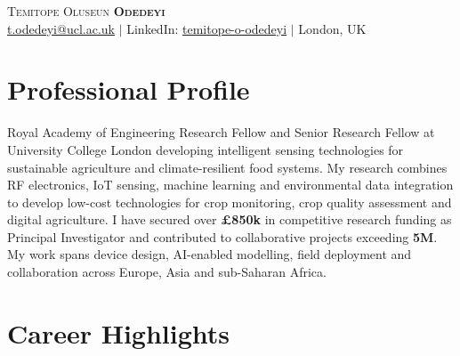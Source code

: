 \documentclass[a4paper,11pt]{article}
\begin{document}

\begin{center}
    {\Huge \textsc{Temitope Oluseun \textbf{Odedeyi}}}\\[3mm]
    \href{mailto:t.odedeyi@ucl.ac.uk}{t.odedeyi@ucl.ac.uk}
    \quad $|$ \quad
    LinkedIn:
    \href{https://www.linkedin.com/in/temitope-o-odedeyi}
    {temitope-o-odedeyi}
    \quad $|$ \quad
    London, UK
\end{center}

\vspace{2mm}


\section{Professional Profile}

Royal Academy of Engineering Research Fellow and Senior Research Fellow at University College London developing intelligent sensing technologies for sustainable agriculture and climate-resilient food systems. My research combines RF electronics, IoT sensing, machine learning and environmental data integration to develop low-cost technologies for crop monitoring, crop quality assessment and digital agriculture. I have secured over \textbf{\pounds850k} in competitive research funding as Principal Investigator and contributed to collaborative projects exceeding \textbf{\texteuro5M}. My work spans device design, AI-enabled modelling, field deployment and collaboration across Europe, Asia and sub-Saharan Africa.


\section{Career Highlights}
\end{document}
